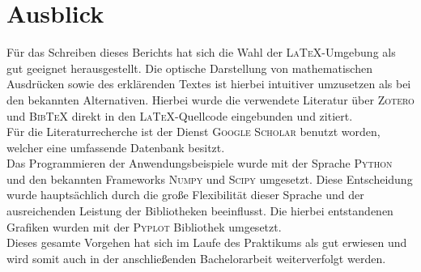 \section{Ausblick}
Für das Schreiben dieses Berichts hat sich die Wahl der \textsc{LaTeX}-Umgebung als gut geeignet herausgestellt. Die optische Darstellung von mathematischen Ausdrücken sowie des erklärenden Textes ist hierbei intuitiver umzusetzen als bei den bekannten Alternativen. Hierbei wurde die verwendete Literatur über \textsc{Zotero} und \textsc{BibTeX} direkt in den \textsc{LaTeX}-Quellcode eingebunden und zitiert.\\
Für die Literaturrecherche ist der Dienst \textsc{Google Scholar} benutzt worden, welcher eine umfassende Datenbank besitzt.\\

Das Programmieren der Anwendungsbeispiele wurde mit der Sprache \textsc{Python} und den bekannten Frameworks \textsc{Numpy} und \textsc{Scipy} umgesetzt. Diese Entscheidung wurde hauptsächlich durch die große Flexibilität dieser Sprache und der ausreichenden Leistung der Bibliotheken beeinflusst. Die hierbei entstandenen Grafiken wurden mit der \textsc{Pyplot} Bibliothek umgesetzt.\\ 

Dieses gesamte Vorgehen hat sich im Laufe des Praktikums als gut erwiesen und wird somit auch in der anschließenden Bachelorarbeit weiterverfolgt werden.
